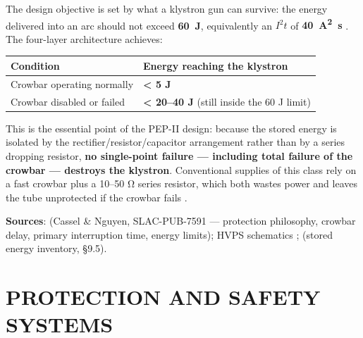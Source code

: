 The design objective is set by what a klystron gun can survive: the energy delivered into an arc should not exceed \textbf{\qty{60}{\joule}}, equivalently an $I^{2}t$ of \textbf{\qty{40}{\ampere\squared\second}} . The four-layer architecture achieves:

\begin{longtable}[]{@{}ll@{}}
\toprule\noalign{}
Condition & Energy reaching the klystron \\
\midrule\noalign{}
\endhead
\bottomrule\noalign{}
\endlastfoot
Crowbar operating normally & \textbf{\textless{} 5 J} \\
Crowbar disabled or failed & \textbf{\textless{} 20--40 J} (still inside the 60 J limit) \\
\end{longtable}

This is the essential point of the PEP-II design: because the stored energy is isolated by the rectifier/resistor/capacitor arrangement rather than by a series dropping resistor, \textbf{no single-point failure --- including total failure of the crowbar --- destroys the klystron}. Conventional supplies of this class rely on a fast crowbar plus a 10--50 Ω series resistor, which both wastes power and leaves the tube unprotected if the crowbar fails .

\begin{keynote}
\textbf{Sources}:  (Cassel \& Nguyen, SLAC-PUB-7591 --- protection philosophy, crowbar delay, primary interruption time, energy limits); HVPS schematics ;  (stored energy inventory, §9.5).
\end{keynote}



\FloatBarrier\clearpage
\part{PROTECTION AND SAFETY SYSTEMS}

